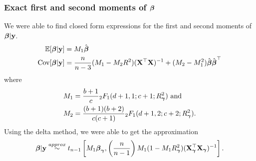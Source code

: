 \documentclass{beamer}
\begin{document}
\begin{frame}
	\frametitle{Exact first and second moments of ${\boldsymbol \beta}$}
	We were able to find closed form
	expressions for the first and second moments of ${\boldsymbol \beta} | {\bf y}$.
	\small
	\begin{align*}
		\mathbb{E}[{\boldsymbol \beta} | {\bf y}] &= M_1 \hat{{\boldsymbol \beta}} \\
		\mbox{Cov}[{\boldsymbol \beta} | {\bf y}] &= \frac{n}{n - 3} (M_1 - M_2 R^2)({\bf X}^\top {\bf X})^{-1} + (M_2 - M_1^2) \hat{{\boldsymbol \beta}} \hat{{\boldsymbol \beta}}^\top
	\end{align*}
	where
	\small
	\begin{align*}
		M_1 &= \frac{b + 1}{c} {}_2 F_1 (d + 1, 1; c + 1; R_{\boldsymbol \gamma}^2) \text{ and } \\
		M_2 &= \frac{(b + 1)(b + 2)}{c(c + 1)} {}_2 F_1 (d + 1, 2; c + 2; R_{\boldsymbol \gamma}^2).
	\end{align*}
	Using the delta method, we were able to get the approximation
	\begin{align*}
		{\boldsymbol\beta} | {\bf y} \stackrel{approx}{\sim} t_{n-1} \left[M_1 {\boldsymbol \beta}_{\boldsymbol \gamma}, \left(\frac{n}{n - 1}\right) M_1 (1 - M_1 R_{\boldsymbol \gamma}^2)({\bf X}_{\boldsymbol \gamma}^\top {\bf X}_{\boldsymbol \gamma})^{-1}\right].
	\end{align*}
\end{frame}


\end{document}
